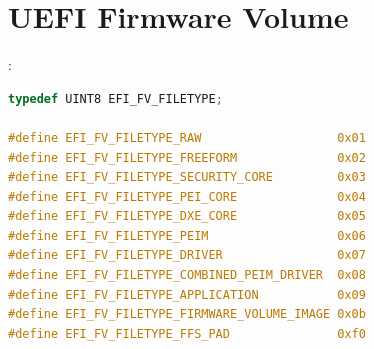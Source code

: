 \section{UEFI Firmware Volume}
\begin{note}:
\begin{lstlisting}[language=C]
typedef UINT8 EFI_FV_FILETYPE;

#define EFI_FV_FILETYPE_RAW                   0x01
#define EFI_FV_FILETYPE_FREEFORM              0x02
#define EFI_FV_FILETYPE_SECURITY_CORE         0x03
#define EFI_FV_FILETYPE_PEI_CORE              0x04
#define EFI_FV_FILETYPE_DXE_CORE              0x05
#define EFI_FV_FILETYPE_PEIM                  0x06
#define EFI_FV_FILETYPE_DRIVER                0x07
#define EFI_FV_FILETYPE_COMBINED_PEIM_DRIVER  0x08
#define EFI_FV_FILETYPE_APPLICATION           0x09
#define EFI_FV_FILETYPE_FIRMWARE_VOLUME_IMAGE 0x0b
#define EFI_FV_FILETYPE_FFS_PAD               0xf0
\end{lstlisting}
\end{note}
